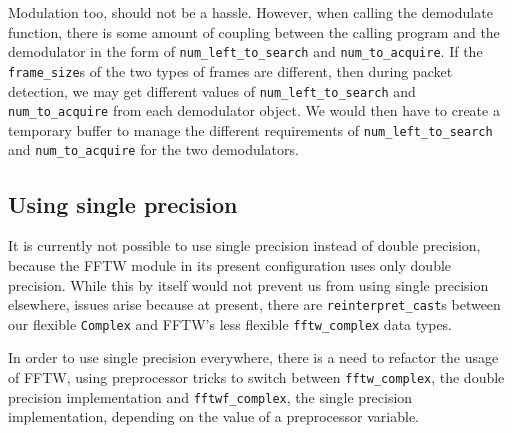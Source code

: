 Modulation too, should not be a hassle. However, when calling the demodulate
function, there is some amount of coupling between the calling program and the
demodulator in the form of \lstinline!num_left_to_search! and
\lstinline!num_to_acquire!. If the \lstinline!frame_size!s of the two types
of frames are different, then during packet detection, we may get different
values of \lstinline!num_left_to_search! and \lstinline!num_to_acquire!
from each demodulator object. We would then have to create a temporary buffer
to manage the different requirements of \lstinline!num_left_to_search! and
\lstinline!num_to_acquire! for the two demodulators.

\subsection{Using single precision}

It is currently not possible to use single precision instead of double
precision, because the FFTW module in its present configuration uses only
double precision. While this by itself would not prevent us from using single
precision elsewhere, issues arise because at present, there are
\lstinline!reinterpret_cast!s between our flexible \lstinline!Complex! and
FFTW's less flexible \lstinline!fftw_complex! data types.

In order to use single precision everywhere, there is a need to refactor the
usage of FFTW, using preprocessor tricks to switch between
\lstinline!fftw_complex!, the double precision implementation and
\lstinline!fftwf_complex!, the single precision implementation, depending on
the value of a preprocessor variable.
